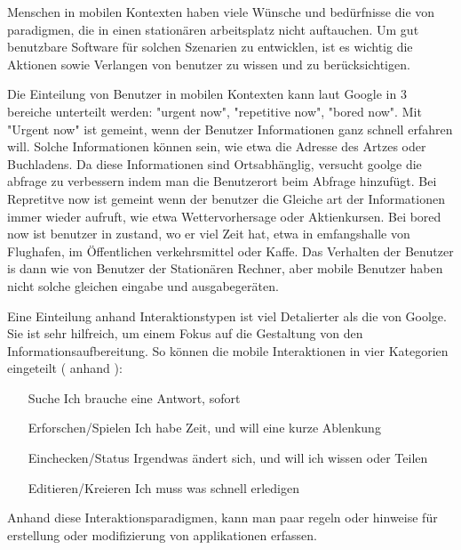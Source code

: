 
Menschen in mobilen Kontexten haben viele Wünsche und bedürfnisse die von paradigmen, die in einen stationären arbeitsplatz nicht auftauchen. Um gut benutzbare Software für solchen Szenarien zu entwicklen, ist es wichtig die Aktionen sowie Verlangen von benutzer zu wissen und zu berücksichtigen. 

Die Einteilung von Benutzer in mobilen Kontexten kann laut Google in 3 bereiche unterteilt werden: "urgent now", "repetitive now", "bored now"\cite{googleUsers}. Mit "Urgent now" ist gemeint, wenn der Benutzer Informationen ganz schnell erfahren will. Solche Informationen können sein, wie etwa die Adresse des Artzes oder Buchladens. Da diese Informationen sind Ortsabhänglig, versucht goolge die abfrage zu verbessern indem man die Benutzerort beim Abfrage hinzufügt. Bei Repretitve now ist gemeint wenn der benutzer die Gleiche art der Informationen immer wieder aufruft, wie etwa Wettervorhersage oder Aktienkursen. Bei bored now ist benutzer in zustand, wo er viel Zeit hat, etwa in emfangshalle von Flughafen, im Öffentlichen verkehrsmittel  oder Kaffe. Das Verhalten der Benutzer is dann wie von Benutzer der Stationären Rechner, aber mobile Benutzer haben nicht solche gleichen eingabe und ausgabegeräten.

Eine Einteilung anhand  Interaktionstypen ist viel Detalierter als die von Goolge. Sie ist sehr hilfreich, um einem Fokus auf die Gestaltung von den Informationsaufbereitung. So können die mobile Interaktionen in vier Kategorien eingeteilt ( anhand \cite[Seite 50]{mobileFirst}):

\begin{itemize}
 	\item[Suche] Ich brauche eine Antwort, sofort
 	\item[Erforschen/Spielen] Ich habe Zeit, und will eine kurze Ablenkung
 	\item[Einchecken/Status] Irgendwas ändert sich, und will ich wissen oder Teilen
 	\item[Editieren/Kreieren] Ich muss was schnell erledigen
 \end{itemize} 

Anhand diese Interaktionsparadigmen, kann man paar regeln oder hinweise für erstellung oder modifizierung von applikationen erfassen.

